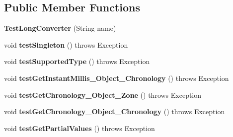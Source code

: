 \subsection*{Public Member Functions}
\begin{DoxyCompactItemize}
\item 
\hypertarget{classorg_1_1joda_1_1time_1_1convert_1_1_test_long_converter_ab2e3b495abaafec7402ed93a2bb3c330}{{\bfseries Test\-Long\-Converter} (String name)}\label{classorg_1_1joda_1_1time_1_1convert_1_1_test_long_converter_ab2e3b495abaafec7402ed93a2bb3c330}

\item 
\hypertarget{classorg_1_1joda_1_1time_1_1convert_1_1_test_long_converter_aa00e3e98a50f8898bc9a203c9de63850}{void {\bfseries test\-Singleton} ()  throws Exception }\label{classorg_1_1joda_1_1time_1_1convert_1_1_test_long_converter_aa00e3e98a50f8898bc9a203c9de63850}

\item 
\hypertarget{classorg_1_1joda_1_1time_1_1convert_1_1_test_long_converter_a55c183a0a17839cf7f1d96b93b8f6928}{void {\bfseries test\-Supported\-Type} ()  throws Exception }\label{classorg_1_1joda_1_1time_1_1convert_1_1_test_long_converter_a55c183a0a17839cf7f1d96b93b8f6928}

\item 
\hypertarget{classorg_1_1joda_1_1time_1_1convert_1_1_test_long_converter_ad9c78fbedce34433e57d500250e049a5}{void {\bfseries test\-Get\-Instant\-Millis\-\_\-\-Object\-\_\-\-Chronology} ()  throws Exception }\label{classorg_1_1joda_1_1time_1_1convert_1_1_test_long_converter_ad9c78fbedce34433e57d500250e049a5}

\item 
\hypertarget{classorg_1_1joda_1_1time_1_1convert_1_1_test_long_converter_abfe5b34354a2bcd65ad1552ab412f33a}{void {\bfseries test\-Get\-Chronology\-\_\-\-Object\-\_\-\-Zone} ()  throws Exception }\label{classorg_1_1joda_1_1time_1_1convert_1_1_test_long_converter_abfe5b34354a2bcd65ad1552ab412f33a}

\item 
\hypertarget{classorg_1_1joda_1_1time_1_1convert_1_1_test_long_converter_abcb5d65b8e8f5252e43a0de0c772592b}{void {\bfseries test\-Get\-Chronology\-\_\-\-Object\-\_\-\-Chronology} ()  throws Exception }\label{classorg_1_1joda_1_1time_1_1convert_1_1_test_long_converter_abcb5d65b8e8f5252e43a0de0c772592b}

\item 
\hypertarget{classorg_1_1joda_1_1time_1_1convert_1_1_test_long_converter_af88258e9bd3e77cf5395f19a886cba75}{void {\bfseries test\-Get\-Partial\-Values} ()  throws Exception }\label{classorg_1_1joda_1_1time_1_1convert_1_1_test_long_converter_af88258e9bd3e77cf5395f19a886cba75}


\end{DoxyCompactItemize}
